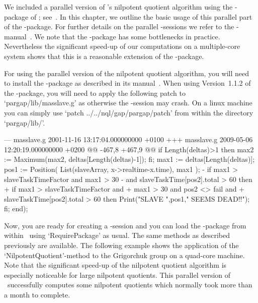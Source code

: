 

We included a parallel version of \NQL's nilpotent quotient
algorithm using the \ParGap-package of \GAP; see~\cite{ParGap}. In
this chapter, we outline the basic usage of this parallel part of the
\NQL-package. For further details on the parallel \GAP-sessions we refer to the
\ParGap-manual~\cite{ParGap}. We note that the \ParGap-package has some
bottlenecks in practice. Nevertheless the significant speed-up of our
computations on a multiple-core system shows that this is a reasonable
extension of the \NQL-package.\medskip

For using the parallel version of the nilpotent quotient algorithm,
you will need to install the \ParGap-package as described in its
manual~\cite{ParGap}. When using Version~1.1.2 of the \ParGap-package,
you will need to apply the following patch to `pargap/lib/masslave.g'
as otherwise the \ParGap-session may crash. On a linux machine you can
simply use `patch \< ../../nql/gap/pargap/patch' from within the directory
`pargap/lib/'.

\beginexample
--- masslave.g	2001-11-16 13:17:04.000000000 +0100
+++ masslave.g	2009-05-06 12:20:19.000000000 +0200
@@ -467,8 +467,9 @@
   if Length(deltas)>1 then max2 := Maximum(max2, deltas[Length(deltas)-1]); fi;
   max1 := deltas[Length(deltas)];
   pos1 := Position( List(slaveArray, x->realtime-x.time), max1 );
-  if max1 > slaveTaskTimeFactor and max1 > 30
-     and slaveTaskTime[pos2].total > 60 then
+  if max1 > slaveTaskTimeFactor and
+     max1 > 30 and pos2 <> fail and 
+     slaveTaskTime[pos2].total > 60 then
     Print("SLAVE ",pos1," SEEMS DEAD!!\n");
   fi;
 end);
\endexample

Now, you are ready for creating a \ParGap-session and you can load
the \NQL-package from within \ParGap\ using `RequirePackage' as usual.
The same methods as described previously are available. The following
example shows the application of the `NilpotentQuotient'-method to
the Grigorchuk group on a quad-core machine. Note that the significant
speed-up of the nilpotent quotient algorithm is especially noticeable
for large nilpotent quotients. This parallel version of \NQL\ successfully
computes some nilpotent quotients which normally took more than a month
to complete.

